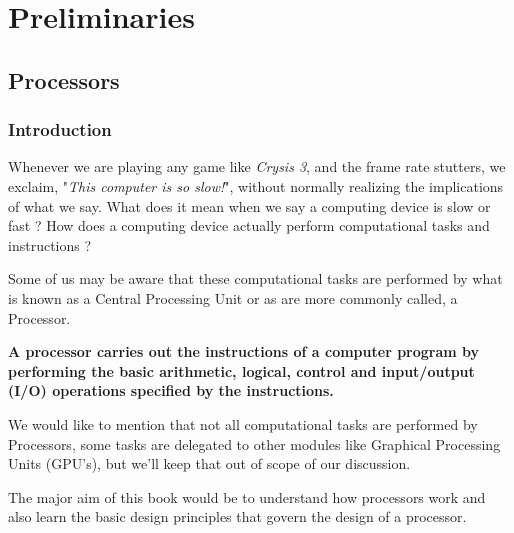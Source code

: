 
\part{Preliminaries}



\chapter{Processors}

\section{Introduction}

Whenever we are playing any game like \textit{Crysis 3}, and the frame rate stutters, we exclaim, "\textit{This computer is so slow!}", without normally realizing the implications of what we say. What does it mean when we say a computing device is slow or fast ? How does a computing device actually perform computational tasks and instructions ?

Some of us may be aware that these computational tasks are performed by what is known as a Central Processing Unit or as are more commonly called, a Processor. 

\textbf{A processor carries out the instructions of a computer program by performing the basic arithmetic, logical, control and input/output (I/O) operations specified by the instructions.}

\begin{remark}
We would like to mention that not all computational tasks are performed by Processors, some tasks are delegated to other modules like Graphical Processing Units (GPU's), but we'll keep that out of scope of our discussion.
\end{remark}

The major aim of this book would be to understand how processors work and also learn the basic design principles that govern the design of a processor. 

